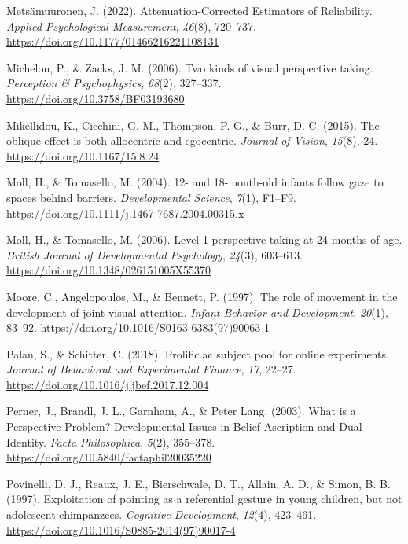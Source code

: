 \documentclass[
  man,mask,floatsintext]{apa6}
\newlength{\cslhangindent}
\newlength{\cslentryspacingunit} %
\newenvironment{CSLReferences}[2] %
 {%
  \setlength{\parindent}{0pt}
  \ifodd #1
  \let\oldpar\par
  \def\par{\hangindent=\cslhangindent\oldpar}
  \fi
  \setlength{\parskip}{#2\cslentryspacingunit}
 }%
 {}
\begin{document}
\begin{CSLReferences}{1}{0}
\leavevmode{}%
Metsämuuronen, J. (2022). Attenuation-{Corrected Estimators} of {Reliability}. \emph{Applied Psychological Measurement}, \emph{46}(8), 720--737. \url{https://doi.org/10.1177/01466216221108131}

\leavevmode{}%
Michelon, P., \& Zacks, J. M. (2006). Two kinds of visual perspective taking. \emph{Perception \& Psychophysics}, \emph{68}(2), 327--337. \url{https://doi.org/10.3758/BF03193680}

\leavevmode{}%
Mikellidou, K., Cicchini, G. M., Thompson, P. G., \& Burr, D. C. (2015). The oblique effect is both allocentric and egocentric. \emph{Journal of Vision}, \emph{15}(8), 24. \url{https://doi.org/10.1167/15.8.24}

\leavevmode{}%
Moll, H., \& Tomasello, M. (2004). 12- and 18-month-old infants follow gaze to spaces behind barriers. \emph{Developmental Science}, \emph{7}(1), F1--F9. \url{https://doi.org/10.1111/j.1467-7687.2004.00315.x}

\leavevmode{}%
Moll, H., \& Tomasello, M. (2006). Level 1 perspective-taking at 24 months of age. \emph{British Journal of Developmental Psychology}, \emph{24}(3), 603--613. \url{https://doi.org/10.1348/026151005X55370}

\leavevmode{}%
Moore, C., Angelopoulos, M., \& Bennett, P. (1997). The role of movement in the development of joint visual attention. \emph{Infant Behavior and Development}, \emph{20}(1), 83--92. \url{https://doi.org/10.1016/S0163-6383(97)90063-1}

\leavevmode{}%
Palan, S., \& Schitter, C. (2018). Prolific.ac subject pool for online experiments. \emph{Journal of Behavioral and Experimental Finance}, \emph{17}, 22--27. \url{https://doi.org/10.1016/j.jbef.2017.12.004}

\leavevmode{}%
Perner, J., Brandl, J. L., Garnham, A., \& Peter Lang. (2003). What is a {Perspective Problem}? {Developmental Issues} in {Belief Ascription} and {Dual Identity}. \emph{Facta Philosophica}, \emph{5}(2), 355--378. \url{https://doi.org/10.5840/factaphil20035220}

\leavevmode{}%
Povinelli, D. J., Reaux, J. E., Bierschwale, D. T., Allain, A. D., \& Simon, B. B. (1997). Exploitation of pointing as a referential gesture in young children, but not adolescent chimpanzees. \emph{Cognitive Development}, \emph{12}(4), 423--461. \url{https://doi.org/10.1016/S0885-2014(97)90017-4}


\end{CSLReferences}
\end{document}
